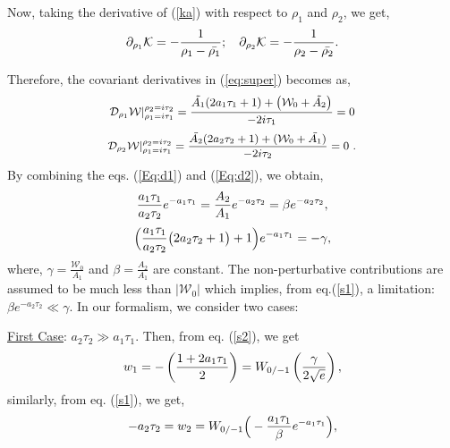 \documentclass[doublecol]{epl2}
\begin{document}
 
 Now, taking the derivative of (\ref{ka}) with respect to $\rho_1$ and $ \rho_2$, we get,
 \begin{equation}\small
     \partial_{\rho_1}\mathcal{K}=-\frac{1}{\rho_1- \Bar{\rho_1}}; \quad \partial_{\rho_2}\mathcal{K}=-\frac{1}{\rho_2- \Bar{\rho_2}}.
 \label{Eq:kd}
 \end{equation}\par
 Therefore, the covariant derivatives in (\ref{eq:super}) becomes as,
 \begin{equation}\small
 \begin{split}
      \mathcal{D}_{\rho_1}\mathcal{W}|_{\rho_1 =i\tau_1}^{{\rho_2} =i\tau_2}=\frac{\Tilde{A_1}(2a_1\tau_1+1)+\left(\mathcal{W}_0+\Tilde{A_2}\right)}{-2i\tau_1}=0
 \label{Eq:d1}
 \end{split}
 \end{equation}
 \begin{equation}\small
 \begin{split}
     \mathcal{D}_{\rho_2}\mathcal{W}|_{\rho_1 =i\tau_1}^{{\rho_2 =i\tau_2}}=\frac{\Tilde{A_2}(2a_2\tau_2+1)+(\mathcal{W}_0+\Tilde{A_1})}{-2i\tau_2}=0 \ .
 \label{Eq:d2}
 \end{split}
 \end{equation}
 By combining the eqs. (\ref{Eq:d1}) and (\ref{Eq:d2}), we obtain, 
 \begin{equation}\small
     \frac{a_1\tau_1}{a_2\tau_2}e^{-a_1\tau_1}=\frac{A_2}{A_1}e^{-a_2\tau_2}= \beta e^{-a_2\tau_2} , 
 \label{s1}
 \end{equation}
 \begin{equation}\small
     \Big(\frac{a_1\tau_1}{a_2\tau_2}\big(2a_2\tau_2+1\big)+1\Big)e^{-a_1\tau_1}=-\gamma ,
\label{s2}
\end{equation}
 where, $\gamma=\frac{\mathcal{W}_0}{A_1}$ and $\beta=\frac{A_2}{A_1}$ are  constant. The non-perturbative contributions are assumed to be much less than $|\mathcal{W}_0|$\cite{Basiouris:2021sdf} which implies, from eq.(\ref{s1}), a limitation: $\beta e^{-a_2 \tau_2} \ll \gamma$.  In our formalism, we consider two cases:\par
 \underline{First Case}: $a_2\tau_2\gg a_1\tau_1$. Then, from eq. (\ref{s2}), we get
\begin{equation}\small
     w_1=-\left(\frac{1+2a_1\tau_1}{2}\right)=W_{0/-1}\left(\frac{\gamma}{2\sqrt{e}}\right),
     \label{case-1t1}
 \end{equation} similarly, from eq. (\ref{s1}), we get,
 \begin{equation}\small
     -a_2\tau_2=w_2=W_{0/{-1}}\Big(-\frac{a_1\tau_1}{\beta}e^{-a_1\tau_1}\Big) ,
 \label{case-1t2}
 \end{equation}
\end{document}
